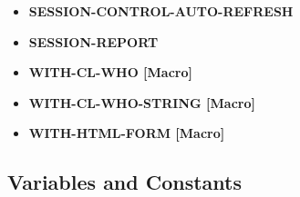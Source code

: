 \documentclass [11pt]{book}
\begin{document}
\begin{itemize}
\item {}
\textbf{SESSION-CONTROL-AUTO-REFRESH}





\item {}
\textbf{SESSION-REPORT}





\item {}
\textbf{WITH-CL-WHO [Macro]}





\item {}
\textbf{WITH-CL-WHO-STRING [Macro]}





\item {}
\textbf{WITH-HTML-FORM [Macro]}





\end{itemize}



\subsection{Variables and Constants}

\label{subsec:variablesandconstants}
\end{document}
